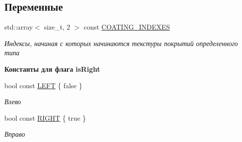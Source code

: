 \subsection*{Переменные}
\begin{DoxyCompactItemize}
\item 
std\+::array$<$ size\+\_\+t, 2 $>$ const \hyperlink{namespacertm_aa92f0dfd3e94d47bed3e7dd2c2e82571}{C\+O\+A\+T\+I\+N\+G\+\_\+\+I\+N\+D\+E\+X\+ES}
\begin{DoxyCompactList}\small\item\em Индексы, начиная с которых начинаются текстуры покрытий определенного типа \end{DoxyCompactList}\end{DoxyCompactItemize}
\begin{Indent}\textbf{ Константы для флага is\+Right}\par
\begin{DoxyCompactItemize}
\item 
\mbox{\label{namespacertm_a92d29773a54951290dd89f754fb39a8c}} 
bool const \hyperlink{namespacertm_a92d29773a54951290dd89f754fb39a8c}{L\+E\+FT} \{ false \}
\begin{DoxyCompactList}\small\item\em Влево \end{DoxyCompactList}\item 
\mbox{\label{namespacertm_a18eb7493925a15e12096e1a6170c3da7}} 
bool const \hyperlink{namespacertm_a18eb7493925a15e12096e1a6170c3da7}{R\+I\+G\+HT} \{ true \}
\begin{DoxyCompactList}\small\item\em Вправо \end{DoxyCompactList}\end{DoxyCompactItemize}
\end{Indent}
